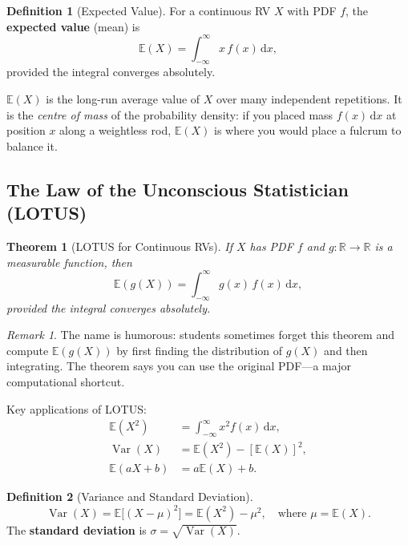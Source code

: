 \documentclass[12pt, a4paper, oneside]{book}
\theoremstyle{definition}
\newtheorem{definition}{Definition}[section]
\theoremstyle{plain}
\newtheorem{theorem}{Theorem}[section]
\theoremstyle{remark}
\newtheorem{remark}{Remark}[section]
\newcommand{\E}{\mathbb{E}}
\newcommand{\Var}{\operatorname{Var}}
\newcommand{\R}{\mathbb{R}}
\begin{document}
\begin{definition}[Expected Value]
For a continuous RV $X$ with PDF $f$, the \textbf{expected value}
(mean) is
\[
  \E(X) = \int_{-\infty}^{\infty} x\,f(x)\,\mathrm{d}x,
\]
provided the integral converges absolutely.
\end{definition}

\begin{intuition}
$\E(X)$ is the long-run average value of $X$ over many independent
repetitions.  It is the \emph{centre of mass} of the probability density:
if you placed mass $f(x)\,\mathrm{d}x$ at position $x$ along a weightless
rod, $\E(X)$ is where you would place a fulcrum to balance it.
\end{intuition}

\subsection{The Law of the Unconscious Statistician (LOTUS)}

\begin{theorem}[LOTUS for Continuous RVs]
\label{thm:lotus}
If $X$ has PDF $f$ and $g:\R\to\R$ is a measurable function, then
\[
  \E(g(X)) = \int_{-\infty}^{\infty} g(x)\,f(x)\,\mathrm{d}x,
\]
provided the integral converges absolutely.
\end{theorem}

\begin{remark}
The name is humorous: students sometimes forget this theorem and compute
$\E(g(X))$ by first finding the distribution of $g(X)$ and then integrating.
The theorem says you can use the original PDF---a major computational
shortcut.
\end{remark}

Key applications of LOTUS:
\begin{align*}
  \E(X^2) &= \int_{-\infty}^{\infty} x^2 f(x)\,\mathrm{d}x, \\
  \Var(X) &= \E(X^2) - [\E(X)]^2, \\
  \E(aX+b) &= a\E(X) + b.
\end{align*}

\begin{definition}[Variance and Standard Deviation]
\[
  \Var(X) = \E\bigl[(X-\mu)^2\bigr] = \E(X^2) - \mu^2,
  \quad \text{where } \mu = \E(X).
\]
The \textbf{standard deviation} is $\sigma = \sqrt{\Var(X)}$.
\end{definition}
\end{document}

